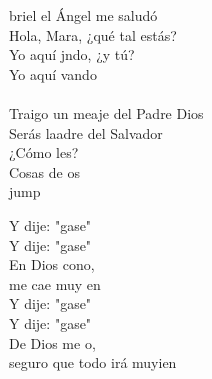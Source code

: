 \begin{cancion}[Hágase][Migueli]%
	briel el Ángel me saludó\\
	Hola, Mara, ¿qué tal estás?\\
	Yo aquí jndo, ¿y tú?\\
	Yo aquí vando\\
	\jump\\
	Traigo un meaje del Padre Dios\\
	Serás laadre del Salvador\\
	¿Cómo les?\\
	Cosas de os\\jump\\
	\begin{chorus}%
	Y dije: "gase" \\
	Y dije: "gase" \\
	En Dios cono, \\
	me cae muy en\\
	Y dije: "gase" \\
	Y dije: "gase" \\
	De Dios me o,\\
	seguro que todo irá muyien\\
	\end{chorus}%
	\jump\\
\end{cancion}%
